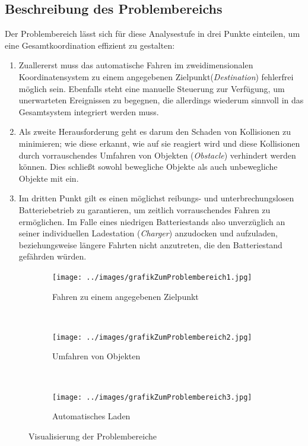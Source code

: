 \documentclass[includeheaders]{scrartcl}
\begin{document}
		\subsection{Beschreibung des Problembereichs}
		Der Problembereich lässt sich für diese Analysestufe in drei Punkte einteilen, um eine Gesamtkoordination effizient zu gestalten:

		\begin{enumerate}
		\item
			Zuallererst muss das automatische Fahren im zweidimensionalen
			Koordinatensystem zu einem angegebenen Zielpunkt(\emph{Destination})
			fehlerfrei möglich sein. Ebenfalls steht eine manuelle Steuerung zur
			Verfügung, um unerwarteten Ereignissen zu begegnen, die allerdings
			wiederum sinnvoll in das Gesamtsystem integriert werden muss.
		\item
			Als zweite Herausforderung geht es darum den Schaden von Kollisionen
			zu minimieren; wie diese erkannt, wie auf sie reagiert wird und diese
			Kollisionen durch vorrauschendes Umfahren von
			Objekten (\emph{Obstacle}) verhindert werden können. Dies schließt
			sowohl bewegliche Objekte als auch unbewegliche Objekte mit ein.
		\item
			Im dritten Punkt gilt es einen möglichst reibungs- und
			unterbrechungslosen Batteriebetrieb zu garantieren, um zeitlich
			vorrauschendes Fahren zu ermöglichen. Im Falle eines niedrigen
			Batteriestands also unverzüglich an seiner individuellen Ladestation
			(\emph{Charger}) anzudocken und aufzuladen, beziehungsweise längere
			Fahrten nicht anzutreten, die den Batteriestand gefährden würden.
		\end{enumerate}

		\begin{figure}[H]
			\centering
			\begin{subfigure}[t]{0.3\textwidth}
				\texttt{[image: ../images/grafikZumProblembereich1.jpg]}
				\caption{Fahren zu einem angegebenen Zielpunkt}
				\label{fig:2-1-problembereich-1}
			\end{subfigure}
			~~~~
			\begin{subfigure}[t]{0.3\textwidth}
				\texttt{[image: ../images/grafikZumProblembereich2.jpg]}
				\caption{Umfahren von Objekten}
				\label{fig:2-1-problembereich-2}
			\end{subfigure}
			~~~~
			\begin{subfigure}[t]{0.3\textwidth}
				\texttt{[image: ../images/grafikZumProblembereich3.jpg]}
				\caption{Automatisches Laden}
				\label{fig:2-1-problembereich-3}
			\end{subfigure}
			\caption{Visualisierung der Problembereiche}\label{fig:2-1-problembereiche}
		\end{figure}
\end{document}
